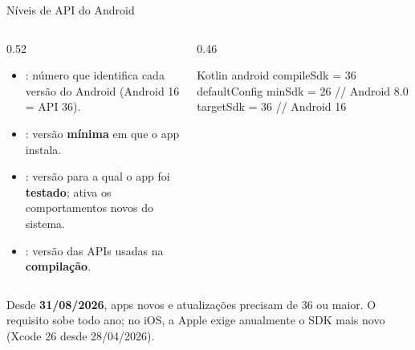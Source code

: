 \documentclass[aspectratio=169,10pt]{beamer}
\begin{document}
\begin{frame}[fragile]{Níveis de API do Android}
  \begin{columns}[T]
    \begin{column}{0.52\textwidth}
      \small
      \begin{itemize}
        \item {}: número que identifica cada versão do Android (Android 16 = API 36).
        \item {}: versão \textbf{mínima} em que o app instala.
        \item {}: versão para a qual o app foi \textbf{testado}; ativa os comportamentos novos do sistema.
        \item {}: versão das APIs usadas na \textbf{compilação}.
      \end{itemize}
    \end{column}
    \begin{column}{0.46\textwidth}
\begin{codigo}[title=app/build.gradle.kts]{Kotlin}
android {
  compileSdk = 36
  defaultConfig {
    minSdk = 26     // Android 8.0
    targetSdk = 36  // Android 16
  }
}
\end{codigo}
    \end{column}
  \end{columns}
  \begin{atencao}
    Desde \textbf{31/08/2026}, apps novos e atualizações precisam de  36 ou maior. O requisito sobe todo ano; no iOS, a Apple exige anualmente o SDK mais novo (Xcode 26 desde 28/04/2026).
  \end{atencao}
\end{frame}
\end{document}
